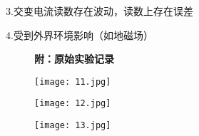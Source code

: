 \documentclass[12pt,a4paper]{article}
\begin{document}
        3.交变电流读数存在波动，读数上存在误差

        4.受到外界环境影响（如地磁场）

    \begin{figure}[htb]
        \textbf{\large 附：原始实验记录}
        
        \centering
        \texttt{[image: 11.jpg]}
    \end{figure}

    \begin{figure}
        \centering
        \texttt{[image: 12.jpg]}
    \end{figure}

    \begin{figure}
        \centering
        \texttt{[image: 13.jpg]}
    \end{figure}
\end{document}
